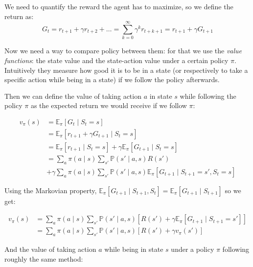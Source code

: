 \documentclass[14pt,a4paper]{article}
\theoremstyle{definition}
\begin{document}
We need to quantify the reward the agent has to maximize, so we define the return as: 
$$G_t= r_{t+1}+\gamma r_{t+2}+ \dots = \sum_{k=0}^{\infty}\gamma^{k}r_{t+k+1} = r_{t+1} + \gamma G_{t+1} $$





Now we need a way to compare policy between them: for that we use the \emph{value functions}: the state value and the state-action value under a certain policy $\pi$. Intuitively they measure how good it is to be in a state (or respectively to take a specific action while being in a state) if we follow the policy afterwards.


Then we can define the value of taking action $a$ in state $s$ while following the policy $\pi$ as the expected return we would receive if we follow $\pi$:


\begin{equation*}
\begin{split}
v_{\pi}(s)&= \mathbb{E}_{\pi}[G_t \mid S_t=s]
\\&=\mathbb{E}_{\pi}\left[ r_{t+1} + \gamma G_{t+1} \mid S_t = s\right]
\\&=\mathbb{E}_{\pi}\left[ r_{t+1} \mid S_t = s \right] + \gamma \mathbb{E}_{\pi}\left[G_{t+1} \mid S_t = s \right]
\\&=\sum_{a}\pi(a \mid s)\sum_{s'}\mathbb{P}(s' \mid a,s)R(s') 
\\&+ \gamma \sum_{a}\pi(a \mid s)\sum_{s'}\mathbb{P}(s'\mid a,s)\mathbb{E}_{\pi}\left[G_{t+1} \mid S_{t+1} = s', S_{t}= s\right]
\end{split}
\end{equation*}

Using the Markovian property, $\mathbb{E}_{\pi}\left[G_{t+1} \mid S_{t+1}, S_{t}\right] = \mathbb{E}_{\pi}\left[G_{t+1} \mid S_{t+1}\right] $ so we get: 

\begin{equation}
\begin{split}
v_{\pi}(s)&= \sum_{a}\pi(a \mid s)\sum_{s'}\mathbb{P}(s'\mid a,s)\left[R(s') +\gamma \mathbb{E}_{\pi}\left[  G_{t+1} \mid S_{t+1}=s'  \right]\right]
\\&=\sum_{a}\pi(a \mid s)\sum_{s'}\mathbb{P}(s'\mid a,s)\left[R(s') + \gamma v_{\pi}(s')\right]
\end{split}
\label{v(s)}
\end{equation}



And the value of taking action $a$ while being in state $s$ under a policy $\pi$ following roughly the same method:
\end{document}
